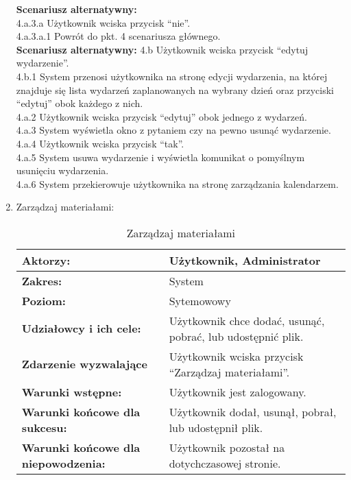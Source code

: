 \begin{enumerate}[label=(\Roman*)]
\textbf{Scenariusz alternatywny:}\\
4.a.3.a Użytkownik wciska przycisk “nie”.\\
4.a.3.a.1 Powrót do pkt. 4 scenariusza głównego.\\
\textbf{Scenariusz alternatywny:}
4.b Użytkownik wciska przycisk “edytuj wydarzenie”.\\
4.b.1 System przenosi użytkownika na stronę edycji wydarzenia, na której znajduje się lista
wydarzeń zaplanowanych na wybrany dzień oraz przyciski “edytuj” obok każdego z nich.\\
4.a.2 Użytkownik wciska przycisk “edytuj” obok jednego z wydarzeń.\\
4.a.3 System wyświetla okno z pytaniem czy na pewno usunąć wydarzenie.\\
4.a.4 Użytkownik wciska przycisk “tak”.\\
4.a.5 System usuwa wydarzenie i wyświetla komunikat o pomyślnym usunięciu wydarzenia.\\
4.a.6 System przekierowuje użytkownika na stronę zarządzania kalendarzem.\\

\item Zarządzaj materiałami:
	\begin{table}[h]
\centering
\caption{Zarządzaj materiałami}
\label{zarządzajmaterialami:}
\begin{tabular}{|p{7cm}|p{7cm}|}
  \hline 
  \textbf{Aktorzy:} & Użytkownik, Administrator\\
  \hline
  \textbf{Zakres:} & System \\
	\hline
  \textbf{Poziom:} & Sytemowowy \\
	\hline
  \textbf{Udziałowcy i ich cele: } & Użytkownik chce dodać, usunąć, pobrać, lub udostępnić plik. \\
	\hline
  \textbf{Zdarzenie wyzwalające } & Użytkownik wciska przycisk “Zarządzaj materiałami”. \\
	\hline
  \textbf{Warunki wstępne: } & Użytkownik jest zalogowany.
 \\
	\hline
  \textbf{Warunki końcowe dla sukcesu:} &Użytkownik dodał, usunął, pobrał, lub udostępnił plik.
 \\
	\hline
  \textbf{Warunki końcowe dla niepowodzenia:} & Użytkownik pozostał na dotychczasowej stronie. \\
  \hline
\end{tabular} 
\end{table}


\end{enumerate}
